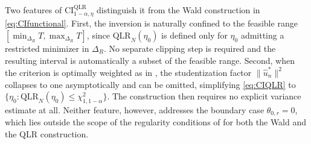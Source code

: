 Two features of $\mathrm{CI}^{\mathrm{QLR}}_{1-\alpha, \eta}$ distinguish it from the Wald construction in \cref{eq:CIfunctional}.
First, the inversion is naturally confined to the feasible range $[\min_{\Delta_R}T, \max_{\Delta_R}T]$, since $\mathrm{QLR}_N(\eta_0)$ is defined only for $\eta_0$ admitting a restricted minimizer in $\Delta_R$.
No separate clipping step is required and the resulting interval is automatically a subset of the feasible range.
Second, when the criterion is optimally weighted as in , the studentization factor $\|\hat{u}^*_n\|^2$ collapses to one asymptotically and can be omitted, simplifying \cref{eq:CIQLR} to $\{\eta_0 : \mathrm{QLR}_N(\eta_0) \leq \chi^2_{1, 1-\alpha}\}$.
The construction then requires no explicit variance estimate at all.
Neither feature, however, addresses the boundary case $\theta_{0,r} = 0$, which lies outside the scope of the regularity conditions of \citet{ChenPouzo2015} for both the Wald and the QLR construction.